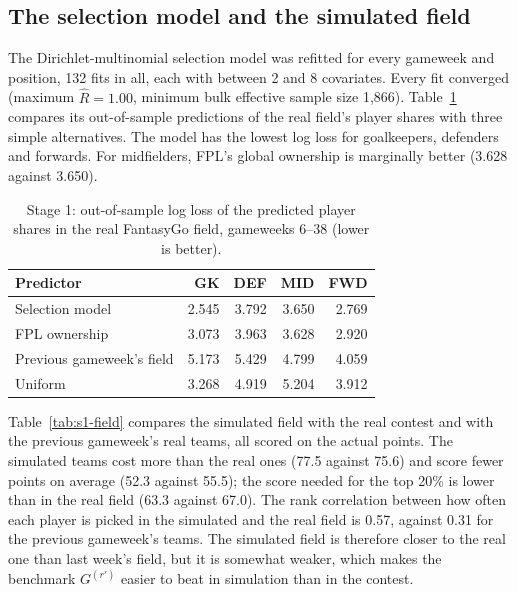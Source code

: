 \documentclass[12pt,oneside,a4paper]{book}
\theoremstyle{definition}
\theoremstyle{remark}
\begin{document}
	\subsection{The selection model and the simulated field}
	\label{sec:s1-field}

	The Dirichlet-multinomial selection model was refitted for every gameweek and position, 132
	fits in all, each with between 2 and 8 covariates. Every fit converged (maximum
	$\hat R = 1.00$, minimum bulk effective sample size 1{,}866). Table~\ref{tab:s1-oos} compares its
	out-of-sample predictions of the real field's player shares with three simple alternatives. The
	model has the lowest log loss for goalkeepers, defenders and forwards. For midfielders, FPL's
	global ownership is marginally better (3.628 against 3.650).

	\begin{table}[ht]
		\centering
		\caption{Stage 1: out-of-sample log loss of the predicted player shares in the real FantasyGo
			field, gameweeks 6--38 (lower is better).}
		\label{tab:s1-oos}
		\begin{tabular}{lrrrr}
			\toprule
			Predictor & GK & DEF & MID & FWD \\
			\midrule
			Selection model         & 2.545 & 3.792 & 3.650 & 2.769 \\
			FPL ownership           & 3.073 & 3.963 & 3.628 & 2.920 \\
			Previous gameweek's field & 5.173 & 5.429 & 4.799 & 4.059 \\
			Uniform                 & 3.268 & 4.919 & 5.204 & 3.912 \\
			\bottomrule
		\end{tabular}
	\end{table}

	Table~\ref{tab:s1-field} compares the simulated field with the real contest and with the
	previous gameweek's real teams, all scored on the actual points. The simulated teams cost more
	than the real ones (77.5 against 75.6) and score fewer points on average (52.3 against 55.5);
	the score needed for the top 20\% is lower than in the real field (63.3 against 67.0). The rank
	correlation between how often each player is picked in the simulated and the real field is
	0.57, against 0.31 for the previous gameweek's teams. The simulated field is therefore closer to
	the real one than last week's field, but it is somewhat weaker, which makes the benchmark
	$G^{(r')}$ easier to beat in simulation than in the contest.
\end{document}
